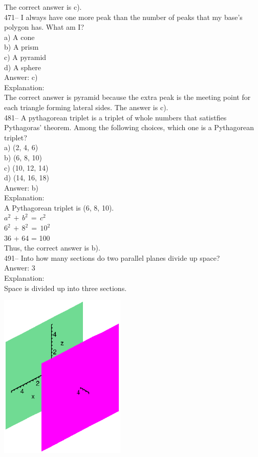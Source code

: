 \documentclass[letterpaper, 12pt]{article}
\begin{document}
The correct answer is c).\\



471-- I always have one more peak than the number of peaks that my base's polygon has.
What am I?\\

a) A cone\\
b) A prism\\
c) A pyramid\\
d) A sphere\\

Answer: c)\\

Explanation: \\
The correct answer is pyramid because the extra peak is the meeting point for each triangle forming lateral sides.
The answer is c).\\


481-- A pythagorean triplet is a triplet of whole numbers that satistfies Pythagoras' theorem.
Among the following choices, which one is a Pythagorean triplet?\\
a) (2, 4, 6)\\
b) (6, 8, 10)\\
c) (10, 12, 14)\\
d) (14, 16, 18)\\

Answer:  b)\\

Explanation: \\
A Pythagorean triplet is (6, 8, 10).\\
$a^{2}\,+\,b^{2}\,=\,c^{2}$\\
$6^{2}\,+\,8^{2}\,=\,10^{2}$\\
36 + 64 = 100\\
Thus, the correct answer is b).\\


491-- Into how many sections do two parallel planes divide up space?\\

Answer: 3\\

Explanation: \\
Space is divided up into three sections.
    \begin{center}
    \includegraphics[width=6cm,bb=0 0 400 400]{deuplanparr.eps}
    \end{center}
\end{document}
